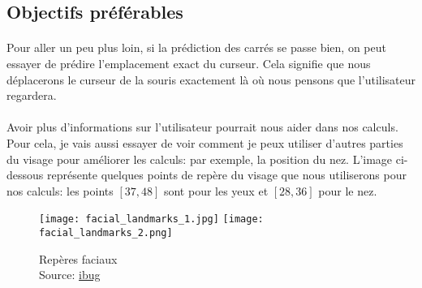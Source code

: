 \subsection{Objectifs préférables}
\paragraph{}
Pour aller un peu plus loin, si la prédiction des carrés se passe bien, on peut essayer de prédire l'emplacement exact du curseur.
Cela signifie que nous déplacerons le curseur de la souris exactement là où nous pensons que l'utilisateur regardera.

\paragraph{}
Avoir plus d'informations sur l'utilisateur pourrait nous aider dans nos calculs.
Pour cela, je vais aussi essayer de voir comment je peux utiliser d'autres parties du visage pour améliorer les calculs: par exemple, la position du nez.
L'image ci-dessous représente quelques points de repère du visage que nous utiliserons pour nos calculs: les points $[37, 48]$ sont pour les yeux et $[28, 36]$ pour le nez.
\begin{figure}[H]
    \centering
    \texttt{[image: facial\_landmarks\_1.jpg]}
    \texttt{[image: facial\_landmarks\_2.png]}
    \caption{Repères faciaux\\Source: \href{https://ibug.doc.ic.ac.uk/resources/300-W/}{ibug}}
    \label{figure:facial-landmarks}
\end{figure}